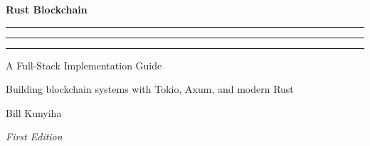 \thispagestyle{empty}
\begin{center}

\vspace*{1in}

{\sffamily\fontsize{48}{54}\selectfont\bfseries\color{brand}
  Rust Blockchain}

\vspace{20pt}

{\color{sectioncolor}\rule[0.4ex]{3pt}{3pt}\hspace{0.4em}%
  \rule[0.4ex]{0.35\textwidth}{1pt}\hspace{0.4em}%
  \rule[0.4ex]{3pt}{3pt}}

\vspace{24pt}

{\sffamily\fontsize{22}{26}\selectfont\color{sectioncolor}
  A Full-Stack Implementation Guide}

\vspace{12pt}

{\sffamily\large\color{brandgray}
  Building blockchain systems with Tokio, Axum, and modern Rust}

\vspace*{2.2in}

{\sffamily\fontsize{18}{20}\selectfont\color{chaptertitle}
  Bill Kunyiha}

\vspace{32pt}

{\sffamily\normalsize\color{sectioncolor}\itshape
  First Edition}

\vspace*{\fill}

\end{center}
\cleardoublepage
